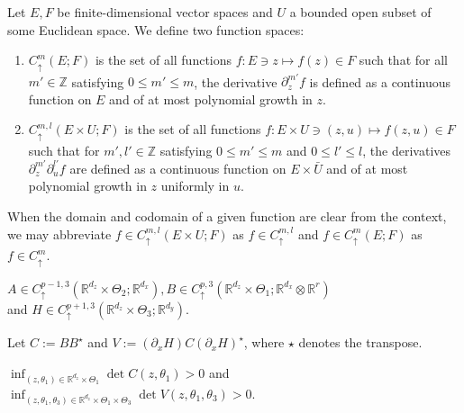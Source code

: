 \documentclass[a4paper,11pt]{jsarticle}
\begin{document}
Let $E,F$ be finite-dimensional vector spaces and $U$ a bounded open subset of some Euclidean space. We define two function spaces:

\begin{enumerate}
    \item $C^{m}_\uparrow(E;F)$ is the set of all functions $f: E \ni z \mapsto f(z) \in F$ such that for all $m' \in \mathbb{Z}$ satisfying $0 \leq m' \leq m$, the derivative $\partial_z^{m'} f$ is defined as a continuous function on $E$ and of at most polynomial growth in $z$.
    \item $C_\uparrow^{m,l}(E \times U ;F)$ is the set of all functions $f: E\times U \ni (z,u) \mapsto f(z,u) \in F$ such that for $m',l' \in \mathbb{Z}$ satisfying $0 \leq m' \leq m $ and $0 \leq l' \leq l$, the derivatives $\partial_z^{m'} \partial_u^{l'} f$ are defined as a continuous function on $E \times \bar{U}$ and of at most polynomial growth in $z$ uniformly in $u$.
\end{enumerate}
 When the domain and codomain of a given function are clear from the context, we may abbreviate $f \in C_\uparrow^{m,l}(E \times U;F)$ as $f \in C_\uparrow^{m,l}$ and $f \in C^m_\uparrow(E;F)$ as $f \in C^m_\uparrow$.


\begin{enumerate}[label = {[{A\arabic*}]},ref=  {[{A\arabic*}]}]\setcounter{enumi}{3}
    \item  $A \in C_\uparrow^{p-1,3 }(\mathbb{R}^{d_z} \times \Theta_2 ; \mathbb{R}^{d_x}),B \in C_\uparrow^{p,3}( \mathbb{R}^{d_z} \times \Theta_1; \mathbb{R}^{d_x} \otimes \mathbb{R}^r)$ \\and $H \in C_\uparrow^{p+1,3}(\mathbb{R}^{d_z} \times \Theta_3; \mathbb{R}^{d_y})$.\label{a2} 
\end{enumerate}
Let $C := B B^{\star}$ and $V := (\partial_x H )C (\partial_x H)^{\star}$, where $\star$ denotes the transpose.
\begin{enumerate}[label = {[{A\arabic*}]},ref=  {[{A\arabic*}]}]\setcounter{enumi}{4}
    \item $\inf_{(z,\theta_1) \in \mathbb{R}^{d_z} \times \Theta_1 } \det C(z,\theta_1)>0$ and $\inf_{(z,\theta_1,\theta_3) \in \mathbb{R}^{d_z} \times \Theta_1 \times \Theta_3 }\det V(z,\theta_1,\theta_3)  >0 $.
\end{enumerate}
\end{document}
